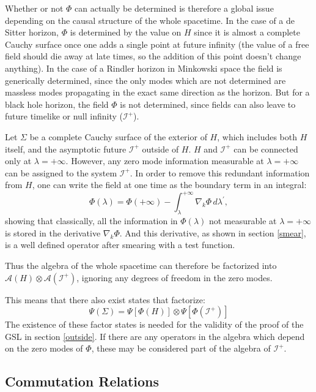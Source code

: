 \documentclass{article}
\begin{document}
Whether or not $\Phi$ can actually be determined is therefore a global issue depending on the causal structure of the whole spacetime.  In the case of a de Sitter horizon, $\Phi$ is determined by the value on $H$ since it is almost a complete Cauchy surface once one adds a single point at future infinity (the value of a free field should die away at late times, so the addition of this point doesn't change anything).  In the case of a Rindler horizon in Minkowski space the field is generically determined, since the only modes which are not determined are massless modes propagating in the exact same direction as the horizon.  But for a black hole horizon, the field $\Phi$ is not determined, since fields can also leave to future timelike or null infinity ($\mathcal{I}^+$).

Let $\Sigma$ be a complete Cauchy surface of the exterior of $H$, which includes both $H$ itself, and the asymptotic future $\mathcal{I}^+$ outside of $H$.  $H$ and $\mathcal{I}^+$ can be connected only at $\lambda = +\infty$.  However, any zero mode information measurable at $\lambda = +\infty$ can be assigned to the system $\mathcal{I}^+$.  In order to remove this redundant information from $H$, one can write the field at one time as the boundary term in an integral:
\begin{equation}\label{break}
\Phi(\lambda) =  \Phi(+\infty) - \int^{+\infty}_{\lambda} \nabla_k \Phi\,d\lambda^\prime,
\end{equation}
showing that classically, all the information in $\Phi(\lambda)$ not measurable at $\lambda = +\infty$ is stored in the derivative $\nabla_k \Phi$.  And this derivative, as shown in section \ref{smear}, is a well defined operator after smearing with a test function.

Thus the algebra of the whole spacetime can therefore be factorized into $\mathcal{A}(H) \otimes \mathcal{A}{(\mathcal{I}^+)}$, ignoring any degrees of freedom in the zero modes.

This means that there also exist states that factorize:
\begin{equation}\label{factor}
\Psi(\Sigma) = \Psi[\Phi(H)] \otimes \Psi[\Phi(\mathcal{I}^+)]
\end{equation}
The existence of these factor states is needed for the validity of the proof of the GSL in section \ref{outside}.  If there are any operators in the algebra which depend on the zero modes of $\Phi$, these may be considered part of the algebra of $\mathcal{I}^+$.

\subsection{Commutation Relations}
\end{document}
